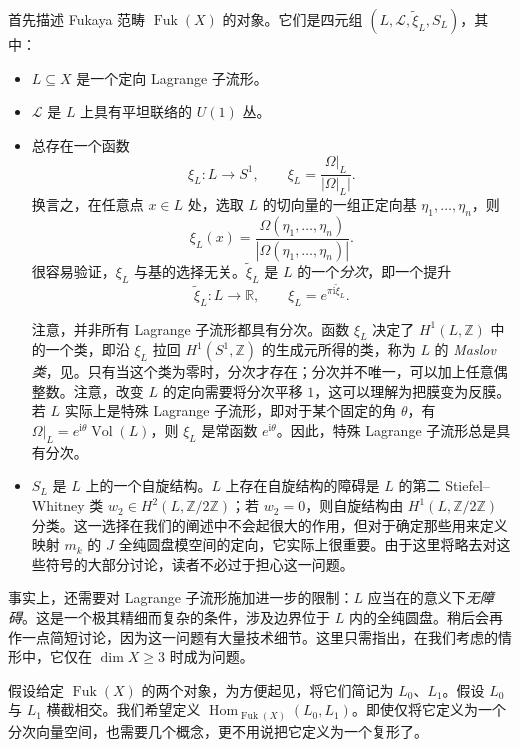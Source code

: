 首先描述 Fukaya 范畴 $\operatorname{Fuk}(X)$ 的对象。它们是四元组 $(L,\mathcal L,\widetilde\xi_L,S_L)$，其中：
\begin{itemize}
\item $L\subseteq X$ 是一个定向 Lagrange 子流形。
\item $\mathcal L$ 是 $L$ 上具有平坦联络的 $U(1)$ 丛。
\item 总存在一个函数
\[
\xi_L\colon L\longrightarrow S^1,\qquad
\xi_L=\frac{\Omega|_L}{|\Omega|_L|}.
\]
换言之，在任意点 $x\in L$ 处，选取 $L$ 的切向量的一组正定向基 $\eta_1,\ldots,\eta_n$，则
\[
\xi_L(x)=\frac{\Omega(\eta_1,\ldots,\eta_n)}
{|\Omega(\eta_1,\ldots,\eta_n)|}.
\]
很容易验证，$\xi_L$ 与基的选择无关。$\widetilde\xi_L$ 是 $L$ 的一个\emph{分次}，即一个提升
\[
\widetilde\xi_L\colon L\longrightarrow\mathbb R,
\qquad \xi_L=e^{\pi\mathrm i\widetilde\xi_L}.
\]

注意，并非所有 Lagrange 子流形都具有分次。函数 $\xi_L$ 决定了 $H^1(L,\mathbb Z)$ 中的一个类，即沿 $\xi_L$ 拉回 $H^1(S^1,\mathbb Z)$ 的生成元所得的类，称为 $L$ 的 \emph{Maslov 类}，见。只有当这个类为零时，分次才存在；分次并不唯一，可以加上任意偶整数。注意，改变 $L$ 的定向需要将分次平移 $1$，这可以理解为把膜变为反膜。若 $L$ 实际上是特殊 Lagrange 子流形，即对于某个固定的角 $\theta$，有 $\Omega|_L=e^{\mathrm i\theta}\operatorname{Vol}(L)$，则 $\xi_L$ 是常函数 $e^{\mathrm i\theta}$。因此，特殊 Lagrange 子流形总是具有分次。

\item $S_L$ 是 $L$ 上的一个自旋结构。$L$ 上存在自旋结构的障碍是 $L$ 的第二 Stiefel--Whitney 类 $w_2\in H^2(L,\mathbb Z/2\mathbb Z)$；若 $w_2=0$，则自旋结构由 $H^1(L,\mathbb Z/2\mathbb Z)$ 分类。这一选择在我们的阐述中不会起很大的作用，但对于确定那些用来定义映射 $m_k$ 的 $J$ 全纯圆盘模空间的定向，它实际上很重要。由于这里将略去对这些符号的大部分讨论，读者不必过于担心这一问题。
\end{itemize}

事实上，还需要对 Lagrange 子流形施加进一步的限制：$L$ 应当在的意义下\emph{无障碍}。这是一个极其精细而复杂的条件，涉及边界位于 $L$ 内的全纯圆盘。稍后会再作一点简短讨论，因为这一问题有大量技术细节。这里只需指出，在我们考虑的情形中，它仅在 $\dim X\geq3$ 时成为问题。

假设给定 $\operatorname{Fuk}(X)$ 的两个对象，为方便起见，将它们简记为 $L_0$、$L_1$。假设 $L_0$ 与 $L_1$ 横截相交。我们希望定义 $\operatorname{Hom}_{\operatorname{Fuk}(X)}(L_0,L_1)$。即使仅将它定义为一个分次向量空间，也需要几个概念，更不用说把它定义为一个复形了。

